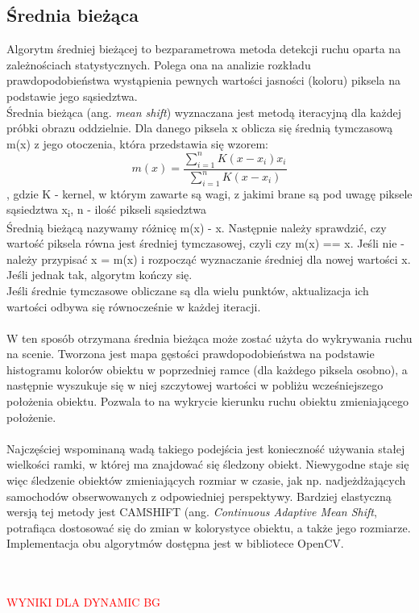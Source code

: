 \subsection{Średnia bieżąca}
Algorytm średniej bieżącej to bezparametrowa metoda detekcji ruchu oparta na zależnościach statystycznych. Polega ona na analizie rozkładu prawdopodobieństwa wystąpienia pewnych wartości jasności (koloru) piksela na podstawie jego sąsiedztwa.\\
\nocite{kheng2011mean}
Średnia bieżąca (ang. \textit{mean shift}) wyznaczana jest metodą iteracyjną dla każdej próbki obrazu oddzielnie. Dla danego piksela x oblicza się średnią tymczasową m(x) z jego otoczenia, która przedstawia się wzorem:
\begin{equation}
m(x) = 
\frac{\sum_{i=1}^{n}K(x-x_{i})x_{i}}{\sum_{i=1}^{n}K(x-x_{i})}
\end{equation}
, gdzie K - kernel, w którym zawarte są wagi, z jakimi brane są pod uwagę piksele sąsiedztwa x\textsubscript{i}, n - ilość pikseli sąsiedztwa \\
Średnią bieżącą nazywamy różnicę m(x) - x.
Następnie należy sprawdzić, czy wartość piksela równa jest średniej tymczasowej, czyli czy m(x) == x. Jeśli nie - należy przypisać x = m(x) i rozpocząć wyznaczanie średniej dla nowej wartości x. Jeśli jednak tak, algorytm kończy się.\\
Jeśli średnie tymczasowe obliczane są dla wielu punktów, aktualizacja ich wartości odbywa się równocześnie w każdej iteracji.
\paragraph{}
W ten sposób otrzymana średnia bieżąca może zostać użyta do wykrywania ruchu na scenie. Tworzona jest mapa gęstości prawdopodobieństwa na podstawie histogramu kolorów obiektu w poprzedniej ramce (dla każdego piksela osobno), a następnie wyszukuje się w niej szczytowej wartości w pobliżu wcześniejszego położenia obiektu. Pozwala to na wykrycie kierunku ruchu obiektu zmieniającego położenie.
\paragraph{}
Najczęściej wspominaną wadą takiego podejścia jest konieczność używania stałej wielkości ramki, w której ma znajdować się śledzony obiekt. Niewygodne staje się więc śledzenie obiektów zmieniających rozmiar w czasie, jak np. nadjeżdżających samochodów obserwowanych z odpowiedniej perspektywy. Bardziej elastyczną wersją tej metody jest CAMSHIFT (ang. \textit{Continuous Adaptive Mean Shift}, potrafiąca dostosować się do zmian w kolorystyce obiektu, a także jego rozmiarze. Implementacja obu algorytmów dostępna jest w bibliotece OpenCV.\\ \\ \\
\begin{LARGE}
\textcolor{red}{WYNIKI DLA DYNAMIC BG}
\end{LARGE}

